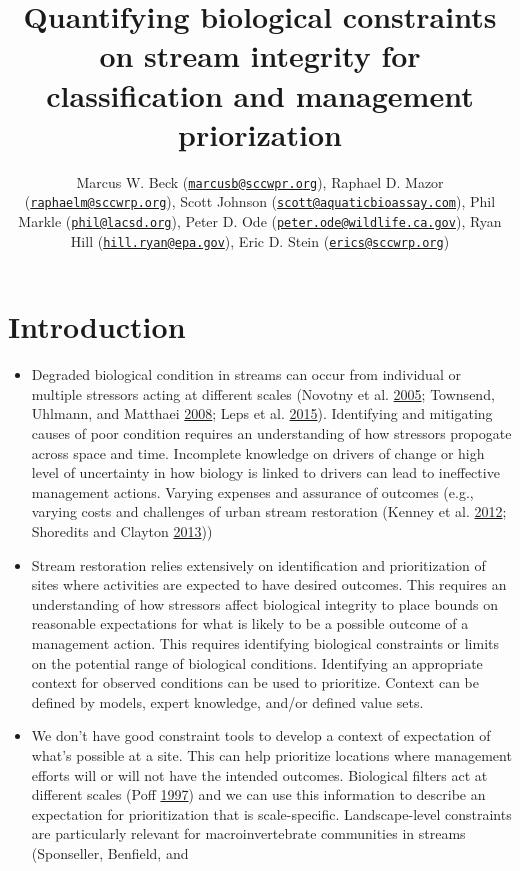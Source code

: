 \documentclass[]{article}
\title{Quantifying biological constraints on stream integrity for
classification and management priorization}
\author{Marcus W. Beck
(\href{mailto:marcusb@sccwpr.org}{\nolinkurl{marcusb@sccwpr.org}}),
Raphael D. Mazor
(\href{mailto:raphaelm@sccwrp.org}{\nolinkurl{raphaelm@sccwrp.org}}),
Scott Johnson
(\href{mailto:scott@aquaticbioassay.com}{\nolinkurl{scott@aquaticbioassay.com}}),
Phil Markle (\href{mailto:phil@lacsd.org}{\nolinkurl{phil@lacsd.org}}),
Peter D. Ode
(\href{mailto:peter.ode@wildlife.ca.gov}{\nolinkurl{peter.ode@wildlife.ca.gov}}),
Ryan Hill
(\href{mailto:hill.ryan@epa.gov}{\nolinkurl{hill.ryan@epa.gov}}), Eric
D. Stein (\href{mailto:erics@sccwrp.org}{\nolinkurl{erics@sccwrp.org}})}
\date{}
\begin{document}
\maketitle

\section{Introduction}\label{introduction}

\begin{itemize}
\item
  Degraded biological condition in streams can occur from individual or
  multiple stressors acting at different scales (Novotny et al.
  \protect\hyperlink{ref-Novotny05}{2005}; Townsend, Uhlmann, and
  Matthaei \protect\hyperlink{ref-Townsend08}{2008}; Leps et al.
  \protect\hyperlink{ref-Leps15}{2015}). Identifying and mitigating
  causes of poor condition requires an understanding of how stressors
  propogate across space and time. Incomplete knowledge on drivers of
  change or high level of uncertainty in how biology is linked to
  drivers can lead to ineffective management actions. Varying expenses
  and assurance of outcomes (e.g., varying costs and challenges of urban
  stream restoration (Kenney et al.
  \protect\hyperlink{ref-Kenney12}{2012}; Shoredits and Clayton
  \protect\hyperlink{ref-Shoredits13}{2013}))
\item
  Stream restoration relies extensively on identification and
  prioritization of sites where activities are expected to have desired
  outcomes. This requires an understanding of how stressors affect
  biological integrity to place bounds on reasonable expectations for
  what is likely to be a possible outcome of a management action. This
  requires identifying biological constraints or limits on the potential
  range of biological conditions. Identifying an appropriate context for
  observed conditions can be used to prioritize. Context can be defined
  by models, expert knowledge, and/or defined value sets.
\item
  We don't have good constraint tools to develop a context of
  expectation of what's possible at a site. This can help prioritize
  locations where management efforts will or will not have the intended
  outcomes. Biological filters act at different scales (Poff
  \protect\hyperlink{ref-Poff97}{1997}) and we can use this information
  to describe an expectation for prioritization that is scale-specific.
  Landscape-level constraints are particularly relevant for
  macroinvertebrate communities in streams (Sponseller, Benfield, and

\end{itemize}
\end{document}
